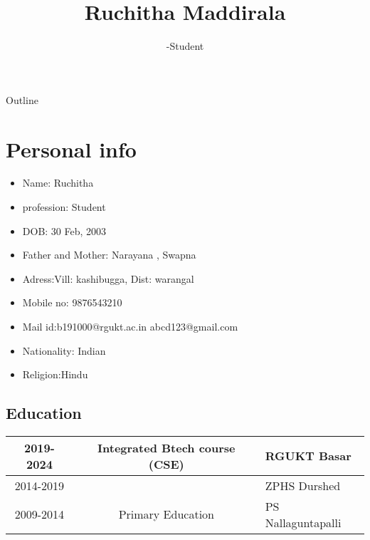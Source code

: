 \usepackage{colortbl} 
\usepackage{xcolor} 
\usepackage{graphicx} 
\title{Ruchitha Maddirala} 
\subtitle{\hspace{3.8cm}\small{-Student}} 
\institute{} 
\author{}  
\begin{frame} 
\titlepage 
\end{frame} 
\begin{frame}{Outline} 
\tableofcontents 
\end{frame} 
\section{Personal info} 
\begin{itemize} 
\item {Name: Ruchitha} 
\item {profession: Student} 
\item {DOB: 30 Feb, 2003 } 
\item {Father and Mother: Narayana , Swapna} 
\item {Adress:\newline Vill: kashibugga,
\newline Dist: warangal} 
\item {Mobile no: 9876543210} 
\item {Mail id:\newline b191000@rgukt.ac.in 
\newline abcd123@gmail.com} 
\item {Nationality: Indian} 
\item {Religion:Hindu} 
\end{itemize} 
\begin{frame} 
\section{Education} 
\begin{tabular}{|c||c||l|} 
\hline 
\rowcolor{orange} 2019-2024 & Integrated Btech course (CSE) & RGUKT Basar\\ 
\hline 
\rowcolor{white} 2014-2019 & \color{blue}{\textbf{SSC}} & ZPHS Durshed\\ 
\hline \rowcolor{green} 2009-2014 & Primary Education & PS Nallaguntapalli\\ 
\hline 
\end{tabular} 
\end{frame} 
